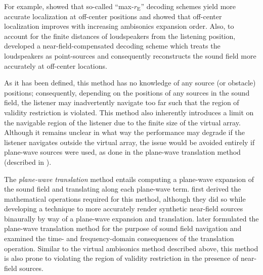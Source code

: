 For example, \citet{Frank2008} showed that so-called ``max-$r_{\textrm{E}}$'' decoding schemes yield more accurate localization at off-center positions and \citet{Satongar2013b} showed that off-center localization improves with increasing ambisonics expansion order.
Also, to account for the finite distances of loudspeakers from the listening position, \citet{Daniel2003b} developed a near-field-compensated decoding scheme which treats the loudspeakers as point-sources and consequently reconstructs the sound field more accurately at off-center locations.

As it has been defined, this method has no knowledge of any source (or obstacle) positions; consequently, depending on the positions of any sources in the sound field, the listener may inadvertently navigate too far such that the region of validity restriction is violated.
This method also inherently introduces a limit on the navigable region of the listener due to the finite size of the virtual array.
Although it remains unclear in what way the performance may degrade if the listener navigates outside the virtual array, the issue would be avoided entirely if plane-wave sources were used, as done in the plane-wave translation method (described in ).

The \textit{plane-wave translation} method entails computing a plane-wave expansion of the sound field and translating along each plane-wave term.
\citet{MenziesAlAkaidi2007b} first derived the mathematical operations required for this method, although they did so while developing a technique to more accurately render synthetic near-field sources binaurally by way of a plane-wave expansion and translation.
\citet{SchultzSpors2013} later formulated the plane-wave translation method for the purpose of sound field navigation and examined the time- and frequency-domain consequences of the translation operation.
Similar to the virtual ambisonics method described above, this method is also prone to violating the region of validity restriction in the presence of near-field sources.

